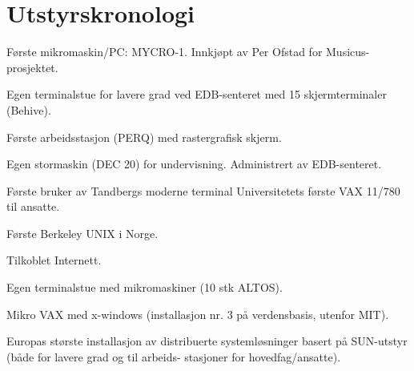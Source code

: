 \chapter*{Utstyrskronologi}

\begin{description}
	\item[1977] Første mikromaskin\slash PC: MYCRO-1. Innkjøpt av Per Ofstad for Musicus-prosjektet.
		\item Egen terminalstue for lavere grad ved EDB-senteret med 15 skjermterminaler (Behive).
	\item[1981] Første arbeidsstasjon (PERQ) med rastergrafisk skjerm.
	\item[1982]  Egen stormaskin (DEC 20) for undervisning. Administrert av EDB-senteret.
	\item Første bruker av Tandbergs moderne terminal Universitetets første VAX 11/780 til ansatte.
	\item Første Berkeley UNIX i Norge.
	\item Tilkoblet Internett.
	\item Egen terminalstue med mikromaskiner (10 stk ALTOS).
	\item[1985] Mikro VAX med x-windows (installasjon nr. 3 på verdensbasis, utenfor MIT).
	\item[1987] Europas største installasjon av distribuerte systemløsninger basert på SUN-utstyr (både for lavere grad og til arbeids- stasjoner for hovedfag/ansatte).
\end{description}
